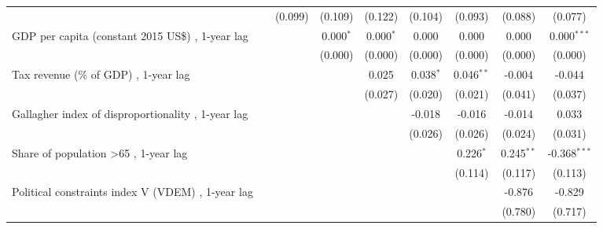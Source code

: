\begin{table}[htbp]
\begin{tabular}{lcccccccc}
                                                                                  &               & (0.099)       & (0.109)       & (0.122)      & (0.104)     & (0.093)      & (0.088)      & (0.077)\\   
      GDP per capita (constant 2015 US\$) , 1-year lag                            &               &               & 0.000$^{*}$   & 0.000$^{*}$  & 0.000       & 0.000        & 0.000        & 0.000$^{***}$\\   
                                                                                  &               &               & (0.000)       & (0.000)      & (0.000)     & (0.000)      & (0.000)      & (0.000)\\   
      Tax revenue (\% of GDP) , 1-year lag                                        &               &               &               & 0.025        & 0.038$^{*}$ & 0.046$^{**}$ & -0.004       & -0.044\\   
                                                                                  &               &               &               & (0.027)      & (0.020)     & (0.021)      & (0.041)      & (0.037)\\   
      Gallagher index of disproportionality , 1-year lag                          &               &               &               &              & -0.018      & -0.016       & -0.014       & 0.033\\   
                                                                                  &               &               &               &              & (0.026)     & (0.026)      & (0.024)      & (0.031)\\   
      Share of population >65 , 1-year lag                                        &               &               &               &              &             & 0.226$^{*}$  & 0.245$^{**}$ & -0.368$^{***}$\\   
                                                                                  &               &               &               &              &             & (0.114)      & (0.117)      & (0.113)\\   
      Political constraints index V (VDEM) , 1-year lag                           &               &               &               &              &             &              & -0.876       & -0.829\\   
                                                                                  &               &               &               &              &             &              & (0.780)      & (0.717)\\   

\end{tabular}
\end{table}
